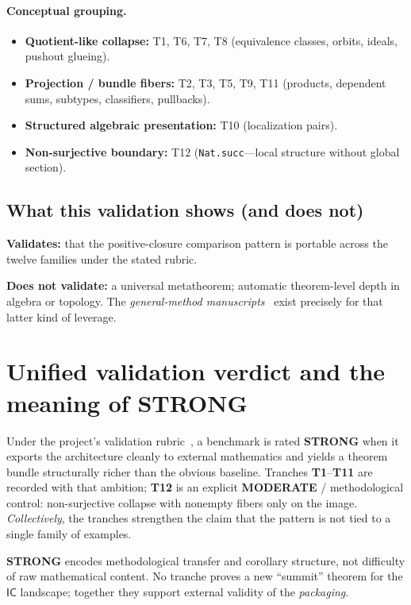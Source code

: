 \documentclass[11pt]{article}
\newcommand{\IC}{\ensuremath{\mathsf{IC}}}
\begin{document}
\paragraph{Conceptual grouping.}
\begin{itemize}[leftmargin=2em]
  \item \textbf{Quotient-like collapse:} T1, T6, T7, T8 (equivalence classes, orbits, ideals, pushout glueing).
  \item \textbf{Projection / bundle fibers:} T2, T3, T5, T9, T11 (products, dependent sums, subtypes, classifiers, pullbacks).
  \item \textbf{Structured algebraic presentation:} T10 (localization pairs).
  \item \textbf{Non-surjective boundary:} T12 (\texttt{Nat.succ}---local structure without global section).
\end{itemize}

\subsection{What this validation shows (and does not)}\label{sec:validate-scope}

\textbf{Validates:} that the positive-closure comparison pattern is portable across the
twelve families under the stated rubric.

\textbf{Does not validate:} a universal metatheorem; automatic theorem-level depth in
algebra or topology. The \emph{general-method manuscripts}~\cite{SpivackFiber,SpivackQuillen}
exist precisely for that latter kind of leverage.

\section{Unified validation verdict and the meaning of \textbf{STRONG}}\label{sec:verdict}

Under the project's validation rubric~\cite{EPIC015WV1}, a benchmark is rated \textbf{STRONG}
when it exports the architecture cleanly to external mathematics and yields a theorem bundle
structurally richer than the obvious baseline. Tranches \textbf{T1}--\textbf{T11} are recorded
with that ambition; \textbf{T12} is an explicit \textbf{MODERATE} / methodological control:
non-surjective collapse with nonempty fibers only on the image. \emph{Collectively}, the
tranches strengthen the claim that the pattern is not tied to a single family of examples.

\textbf{STRONG} encodes methodological transfer and corollary structure, not difficulty of
raw mathematical content. No tranche proves a new ``summit'' theorem for the \IC{} landscape;
together they support external validity of the \emph{packaging}.
\end{document}

